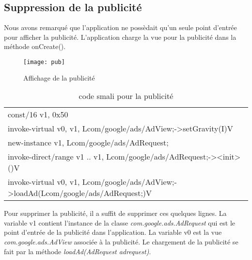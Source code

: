 
\subsection{Suppression de la publicité}
Nous avons remarqué que l'application ne possèdait qu'un seule point d'entrée pour afficher la publicité.
L'application charge la vue pour la publicité dans la méthode \hbox{onCreate()}.
\begin{figure}[!h]
	      \begin{center}
		\texttt{[image: pub]}
	      \end{center}
	\caption{Affichage de la publicité}
\end{figure}

\begin{table}[here]
    \begin{center}
	\begin{tabular}{l}
	const/16 v1, 0x50 \\[0.2cm]
	
	invoke-virtual {v0, v1}, Lcom/google/ads/AdView;->setGravity(I)V \\[0.2cm]

	new-instance v1, Lcom/google/ads/AdRequest; \\[0.2cm]

	invoke-direct/range {v1 .. v1}, Lcom/google/ads/AdRequest;-><init>()V \\[0.2cm]

	invoke-virtual {v0, v1}, Lcom/google/ads/AdView;->loadAd(Lcom/google/ads/AdRequest;)V \\
	\end{tabular}
    \end{center}
    \caption{\label{}code smali pour la publicité}
\end{table}

Pour supprimer la publicité, il a suffit de supprimer ces quelques lignes.
La variable v1 contient l'instance de la classe \textit{com.google.ads.AdRequest} qui est le point d'entrée de la publicité dans l'application.
La variable v0 est la vue \textit{com.google.ads.AdView} associée à la publicité. Le chargement de la publicité se fait par la méthode \textit{loadAd(AdRequest adrequest)}.
